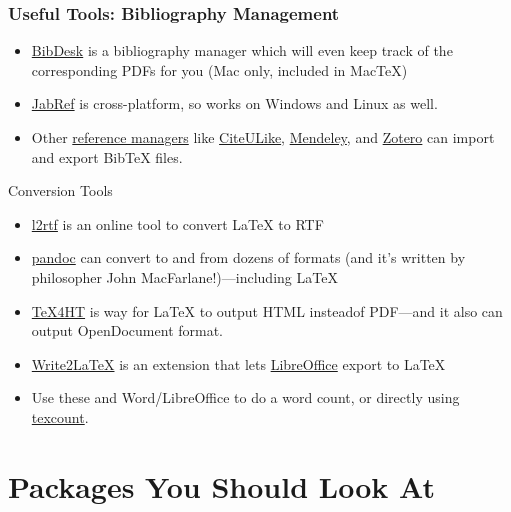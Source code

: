 \begin{frame}
\frametitle{Useful Tools: Bibliography Management}

\begin{itemize}
\item \href{http://bibdesk.sourceforge.net/}{BibDesk} is a bibliography manager which will even keep track of the corresponding PDFs for you (Mac only, included in MacTeX)
\item \href{http://jabref.sourceforge.net/}{JabRef} is cross-platform, so works on Windows and Linux as well.
\item Other \href{http://en.wikipedia.org/wiki/Comparison_of_reference_management_software}{reference managers} like \href{http://www.citeulike.org/}{CiteULike}, \href{http://www.mendeley.com/}{Mendeley}, and \href{http://www.zotero.org/}{Zotero} can import and export Bib\TeX{} files. 
\end{itemize}

\end{frame}

\begin{frame}{Conversion Tools}

\begin{itemize}
\item \href{http://www.sciweavers.org/convert-latex-to-rtf}{l2rtf}
  is an online tool to convert \LaTeX{} to RTF
\item \href{http://johnmacfarlane.net/pandoc/}{pandoc} can convert to
  and from dozens of formats (and it's written by philosopher
  John MacFarlane!)---including \LaTeX
\item \href{http://www.tug.org/applications/tex4ht/mn.html}{TeX4HT} is
  way for \LaTeX{} to output HTML insteadof PDF---and it also can
  output OpenDocument format. 
\item
  \href{http://extensions.libreoffice.org/extension-center/writer2latex-1}{Write2LaTeX}
  is an extension that lets
  \href{http://www.libreoffice.org/}{LibreOffice} export to \LaTeX{}
\item Use these and Word/LibreOffice to do a word count, or directly
  using \href{http://app.uio.no/ifi/texcount/index.html}{texcount}.
\end{itemize}

\end{frame}




\section{Packages You Should Look At}

